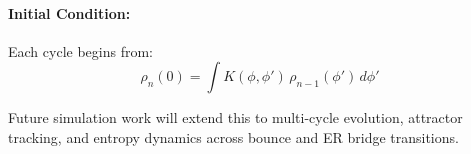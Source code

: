 \paragraph{Initial Condition:}
Each cycle begins from:
\[
\rho_n(0) = \int K(\phi, \phi') \, \rho_{n-1}(\phi') \, d\phi'
\]

Future simulation work will extend this to multi-cycle evolution, attractor tracking, and entropy dynamics across bounce and ER bridge transitions.

